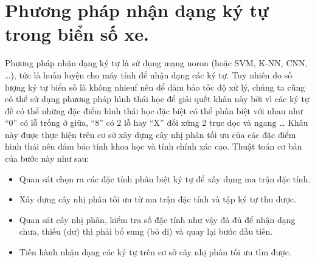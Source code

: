     \section{Phương pháp nhận dạng ký tự trong biển số xe.}
    Phương pháp nhận dạng ký tự là sử dụng mạng noron (hoặc SVM, K-NN, CNN, …), tức là huấn luyện cho máy tính để nhận dạng các ký tự. Tuy nhiên do số lượng ký tự biển số là không nhieuf nên để đảm bảo tốc độ xử lý, chúng ta cũng có thể sử dụng phương pháp hình thái học để giải quết khâu này bởi vì các ký tự đề có thể những đặc điểm hình thái học đặc biệt có thể phân biệt với nhau như “0” có lỗ trống ở giữa, “8” có 2 lỗ hay “X” đối xứng 2 trục dọc và ngang … Khâu này được thực hiện trên cơ sở xây dựng cây nhị phân tối ưu của các đặc điểm hình thái  nên đảm bảo tính khoa học và tính chính xác cao. Thuật toán cơ bản của bước này như sau:
    \begin{itemize}
        \item Quan sát chọn ra các đặc tính phân biệt ký tự để xây dụng ma trận đặc tính.
        \item Xây dựng cây nhị phân tối ưu từ ma trận đặc tính và tập ký tự thu được.
        \item Quan sát cây nhị phân, kiểm tra số đặc tính như vậy đã đủ để nhận dạng chưa, thiếu (dư) thì phải bổ sung (bỏ đi) và quay lại bước đầu tiên.
	    \item Tiến hành nhận dạng các ký tự trên cơ sở cây nhị phân tối ưu tìm được.
    \end{itemize}
    
